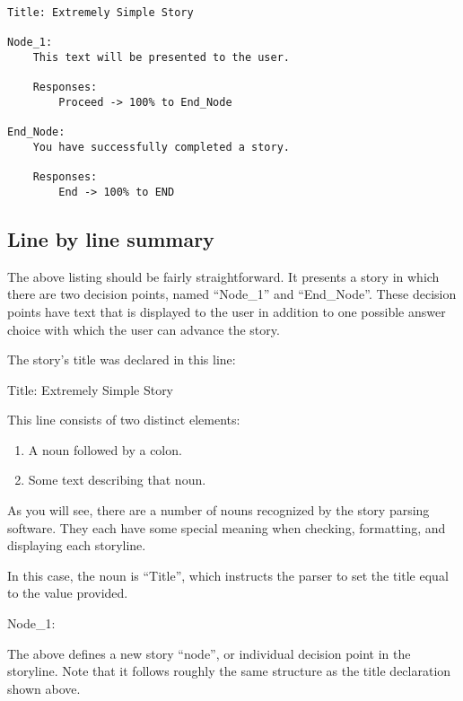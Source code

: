 \documentclass[12pt,letterpaper]{article}
\begin{document}
\lstset{numbers=left, frame=shadowbox}
\begin{lstlisting}[breaklines=true]
Title: Extremely Simple Story

Node_1:
    This text will be presented to the user.
    
    Responses:
        Proceed -> 100% to End_Node

End_Node:
    You have successfully completed a story.
    
    Responses:
        End -> 100% to END
\end{lstlisting}

\subsection{Line by line summary}
The above listing should be fairly straightforward.
It presents a story in which there are two decision points, named ``Node\_1'' and ``End\_Node''. These decision points have text that is displayed to the user in addition to one possible answer choice with which the user can advance the story.

The story's title was declared in this line:

\begin{center}
Title: Extremely Simple Story
\end{center}

This line consists of two distinct elements:
\begin{enumerate}
 \item A noun followed by a colon.
 \item Some text describing that noun.
\end{enumerate}

As you will see, there are a number of nouns recognized by the story parsing software\footnotemark[1]. They each have some special meaning when checking, formatting, and displaying each storyline.

In this case, the noun is ``Title'', which instructs the parser to set the title equal to the value provided.


\begin{center}
Node\_1:
\end{center}

The above defines a new story ``node'', or individual decision point in the storyline. Note that it follows roughly the same structure as the title declaration shown above.
\end{document}
